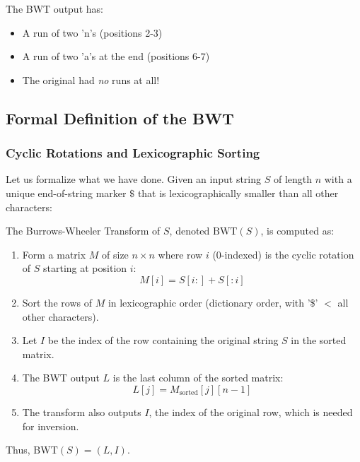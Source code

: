 The BWT output has:
\begin{itemize}
    \item A run of two 'n's (positions 2-3)
    \item A run of two 'a's at the end (positions 6-7)
    \item The original had \emph{no} runs at all!
\end{itemize}

\subsection{Formal Definition of the BWT}
\label{sec:bwt_formal}

\subsubsection{Cyclic Rotations and Lexicographic Sorting}

Let us formalize what we have done. Given an input string \(S\) of length \(n\) with a unique end-of-string marker \(\$\) that is lexicographically smaller than all other characters:

\begin{definitionbox}

The Burrows-Wheeler Transform of \(S\), denoted \(\text{BWT}(S)\), is computed as:

\begin{enumerate}
    \item Form a matrix \(M\) of size \(n \times n\) where row \(i\) (0-indexed) is the cyclic rotation of \(S\) starting at position \(i\): 
    \[ M[i] = S[i:] + S[:i] \]
    
    \item Sort the rows of \(M\) in lexicographic order (dictionary order, with '\$' $<$ all other characters).
    
    \item Let \(I\) be the index of the row containing the original string \(S\) in the sorted matrix.
    
    \item The BWT output \(L\) is the last column of the sorted matrix: 
    \[ L[j] = M_{\text{sorted}}[j][n-1] \]
    
    \item The transform also outputs \(I\), the index of the original row, which is needed for inversion.
\end{enumerate}

Thus, \(\text{BWT}(S) = (L, I)\).
\end{definitionbox}

